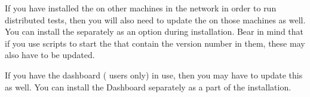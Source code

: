 If you have installed the \gdagent{} on other machines in the network in order to run distributed tests, then you will also need to update the \gdagent{} on those machines as well. You can install the \gdagent{} separately as an option during installation. Bear in mind that if you use scripts to start the \gdagent{} that contain the version number in them, these may also have to be updated. 

If you have the dashboard (\gd{} users only) in use, then you may have to update this as well. You can install the Dashboard separately as a part of the installation.
